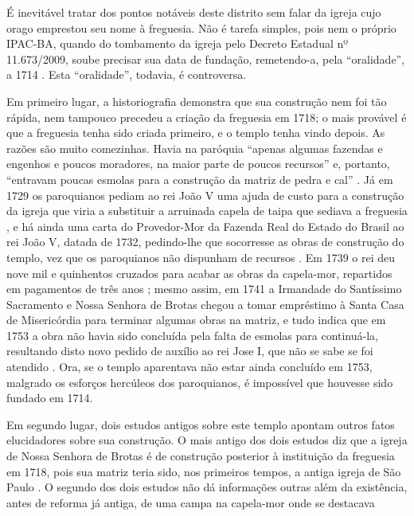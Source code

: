 É inevitável tratar dos pontos notáveis deste distrito sem falar da igreja cujo orago emprestou seu nome à freguesia. Não é tarefa simples, pois nem o próprio IPAC-BA, quando do tombamento da igreja pelo Decreto Estadual nº 11.673/2009, soube precisar sua data de fundação, remetendo-a, pela ``oralidade'', a 1714 \cite{ipac_brotas_2015}. Esta ``oralidade'', todavia, é controversa. 

Em primeiro lugar, a historiografia demonstra que sua construção nem foi tão rápida, nem tampouco precedeu a criação da freguesia em 1718; o mais provável é que a freguesia tenha sido criada primeiro, e o templo tenha vindo depois. As razões são muito comezinhas. Havia na paróquia ``apenas algumas fazendas e engenhos e poucos moradores, na maior parte de poucos recursos'' e, portanto, ``entravam poucas esmolas para a construção da matriz de pedra e cal'' \cite[p.~10]{ott_engenhos_1996}. Já em 1729 os paroquianos pediam ao rei João V uma ajuda de custo para a construção da igreja que viria a substituir a arruinada capela de taipa que sediava a freguesia \cite[p.~10]{ott_engenhos_1996}, e há ainda uma carta do Provedor-Mor da Fazenda Real do Estado do Brasil ao rei João V, datada de 1732, pedindo-lhe que socorresse as obras de construção do templo, vez que os paroquianos não dispunham de recursos \cite[p.~30]{vivas_botelho_2011}. Em 1739 o rei deu nove mil e quinhentos cruzados para acabar as obras da capela-mor, repartidos em pagamentos de três anos \cite[p.~10]{ott_engenhos_1996}; mesmo assim, em 1741 a Irmandade do Santíssimo Sacramento e Nossa Senhora de Brotas chegou a tomar empréstimo à Santa Casa de Misericórdia para terminar algumas obras na matriz, e tudo indica que em 1753 a obra não havia sido concluída pela falta de esmolas para continuá-la, resultando disto novo pedido de auxílio ao rei Jose I, que não se sabe se foi atendido \cite[p.~10]{ott_engenhos_1996}. Ora, se o templo aparentava não estar ainda concluído em 1753, malgrado os esforços hercúleos dos paroquianos, é impossível que houvesse sido fundado em 1714. 

Em segundo lugar, dois estudos antigos sobre este templo \cite{campos_brotas_1942,texbar_capellas_1930} apontam outros fatos elucidadores sobre sua construção. O mais antigo dos dois estudos diz que a igreja de Nossa Senhora de Brotas é de construção posterior à instituição da freguesia em 1718, pois sua matriz teria sido, nos primeiros tempos, a antiga igreja de São Paulo \cite[p.~344]{texbar_capellas_1930}. O segundo dos dois estudos não dá informações outras além da existência, antes de reforma já antiga, de uma campa na capela-mor onde se destacava 

